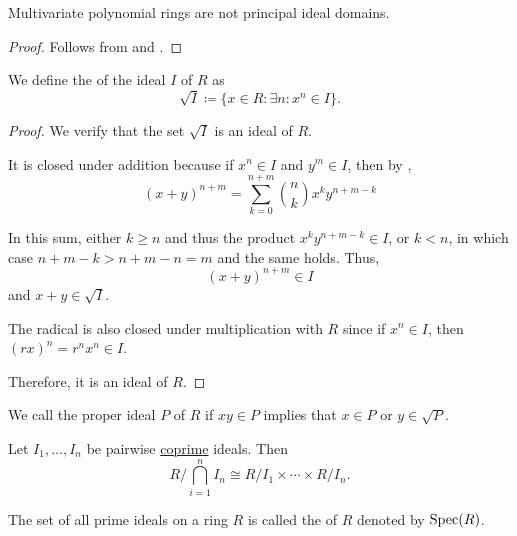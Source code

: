 \begin{corollary}\label{thm:multivariate_polynomial_rings_are_not_pid}
  Multivariate polynomial rings are not principal ideal domains.
\end{corollary}
\begin{proof}
  Follows from  and .
\end{proof}

\begin{definition}\label{def:radical_ideal}
  We define the  of the ideal \( I \) of \( R \) as
  \begin{equation*}
    \sqrt I \coloneqq \{ x \in R \colon \exists n: x^n \in I \}.
  \end{equation*}
\end{definition}
\begin{proof}
  We verify that the set \( \sqrt I \) is an ideal of \( R \).

  It is closed under addition because if \( x^n \in I \) and \( y^m \in I \), then by ,
  \begin{equation*}
    (x + y)^{n+m}
    =
    \sum_{k=0}^{n+m} \binom n k x^k y^{n+m-k}
  \end{equation*}

  In this sum, either \( k \geq n \) and thus the product \( x^k y^{n+m-k} \in I \), or \( k < n \), in which case \( n + m - k > n + m - n = m \) and the same holds. Thus,
  \begin{equation*}
    (x + y)^{n+m} \in I
  \end{equation*}
  and \( x + y \in \sqrt I \).

  The radical is also closed under multiplication with \( R \) since if \( x^n \in I \), then \( (rx)^n = r^n x^n \in I \).

  Therefore, it is an ideal of \( R \).
\end{proof}

\begin{definition}\label{def:primary_ring_ideal}
  We call the proper ideal \( P \) of \( R \)  if \( xy \in P \) implies that \( x \in P \) or \( y \in \sqrt P \).
\end{definition}

\begin{theorem}\label{thm:chinese_remained_theorem}
  Let \( I_1, \ldots, I_n \) be pairwise \hyperref[def:coprime_ring_ideals]{coprime} ideals. Then
  \begin{equation*}
    R / \bigcap_{i=1}^n I_n \cong R / I_1 \times \cdots \times R / I_n.
  \end{equation*}
\end{theorem}

\begin{definition}\label{def:spectrum_of_ring}
  The set of all prime ideals on a ring \( R \) is called the  of \( R \) denoted by \( \operatorname{Spec}(R) \).
\end{definition}

